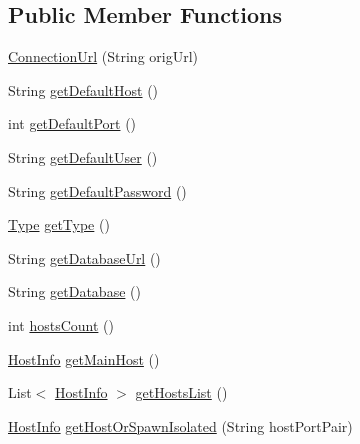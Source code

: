 \subsection*{Public Member Functions}
\begin{DoxyCompactItemize}
\item 
\mbox{\hyperlink{classcom_1_1mysql_1_1cj_1_1conf_1_1_connection_url_aefa00d04adfdec4b23d81d9c340e736f}{Connection\+Url}} (String orig\+Url)
\item 
String \mbox{\hyperlink{classcom_1_1mysql_1_1cj_1_1conf_1_1_connection_url_a642faf5647403f81ccc6bd07d7a142b3}{get\+Default\+Host}} ()
\item 
int \mbox{\hyperlink{classcom_1_1mysql_1_1cj_1_1conf_1_1_connection_url_ae02cd435e2ee29c886621ef728162a4b}{get\+Default\+Port}} ()
\item 
String \mbox{\hyperlink{classcom_1_1mysql_1_1cj_1_1conf_1_1_connection_url_a9c7c39c11e822c5d253069e4c95c9fba}{get\+Default\+User}} ()
\item 
String \mbox{\hyperlink{classcom_1_1mysql_1_1cj_1_1conf_1_1_connection_url_a2bbd7c56d39042e376fbdc28eff508e5}{get\+Default\+Password}} ()
\item 
\mbox{\hyperlink{enumcom_1_1mysql_1_1cj_1_1conf_1_1_connection_url_1_1_type}{Type}} \mbox{\hyperlink{classcom_1_1mysql_1_1cj_1_1conf_1_1_connection_url_af2928b801cd9b2eaf89e94b3b123e357}{get\+Type}} ()
\item 
String \mbox{\hyperlink{classcom_1_1mysql_1_1cj_1_1conf_1_1_connection_url_a574945f907f1b2aadd0f056e0e240bbf}{get\+Database\+Url}} ()
\item 
String \mbox{\hyperlink{classcom_1_1mysql_1_1cj_1_1conf_1_1_connection_url_abdfbf97b8d787783473d36722cfae81a}{get\+Database}} ()
\item 
int \mbox{\hyperlink{classcom_1_1mysql_1_1cj_1_1conf_1_1_connection_url_ac75c964d5381fcfeaebed87ee2bb22b3}{hosts\+Count}} ()
\item 
\mbox{\hyperlink{classcom_1_1mysql_1_1cj_1_1conf_1_1_host_info}{Host\+Info}} \mbox{\hyperlink{classcom_1_1mysql_1_1cj_1_1conf_1_1_connection_url_a97fd0f7c1fa6ffdc8cb195f58b4b5ca1}{get\+Main\+Host}} ()
\item 
List$<$ \mbox{\hyperlink{classcom_1_1mysql_1_1cj_1_1conf_1_1_host_info}{Host\+Info}} $>$ \mbox{\hyperlink{classcom_1_1mysql_1_1cj_1_1conf_1_1_connection_url_a31b073fdc19d1f315105a20bc6b3f5f1}{get\+Hosts\+List}} ()
\item 
\mbox{\hyperlink{classcom_1_1mysql_1_1cj_1_1conf_1_1_host_info}{Host\+Info}} \mbox{\hyperlink{classcom_1_1mysql_1_1cj_1_1conf_1_1_connection_url_a45a6498954bd6fad0a39edb05805882a}{get\+Host\+Or\+Spawn\+Isolated}} (String host\+Port\+Pair)

\end{DoxyCompactItemize}
